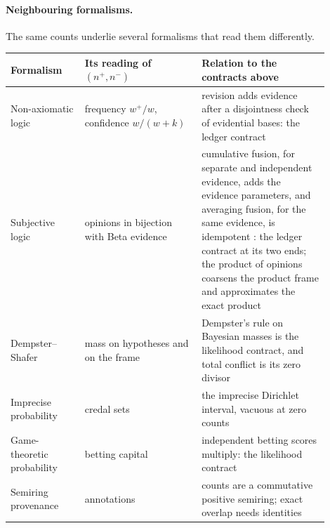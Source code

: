 \documentclass[11pt]{article}
\theoremstyle{definition}
\theoremstyle{remark}
\begin{document}
\paragraph{Neighbouring formalisms.}
The same counts underlie several formalisms that read them differently.
\begin{center}
\small
\begin{tabular}{>{\raggedright\arraybackslash}p{0.21\linewidth}%
                >{\raggedright\arraybackslash}p{0.33\linewidth}%
                >{\raggedright\arraybackslash}p{0.36\linewidth}}
\toprule
Formalism & Its reading of $(n^+,n^-)$ & Relation to the contracts above \\
\midrule
Non-axiomatic logic \cite{WangNAL} & frequency $w^+/w$, confidence $w/(w+k)$ &
  revision adds evidence after a disjointness check of evidential bases: the
  ledger contract \\
Subjective logic \cite{JosangBeliefCalculus} & opinions in bijection with Beta
  evidence & cumulative fusion, for separate and independent evidence, adds the
  evidence parameters, and averaging fusion, for the same evidence, is
  idempotent \cite{JosangFission}: the ledger contract at its two ends; the
  product of opinions coarsens the product frame and approximates the exact
  product \cite{JosangBeliefCalculus} \\
Dempster--Shafer \cite{ShaferEvidence} & mass on hypotheses and on the frame &
  Dempster's rule on Bayesian masses is the likelihood contract, and total
  conflict is its zero divisor \\
Imprecise probability \cite{WalleyBagOfMarbles} & credal sets &
  the imprecise Dirichlet interval, vacuous at zero counts \\
Game-theoretic probability \cite{ShaferVovkGTP} & betting capital &
  independent betting scores multiply: the likelihood contract \\
Semiring provenance \cite{GreenProvenanceSemirings} & annotations &
  counts are a commutative positive semiring; exact overlap needs identities \\
\bottomrule
\end{tabular}
\end{center}
\end{document}
